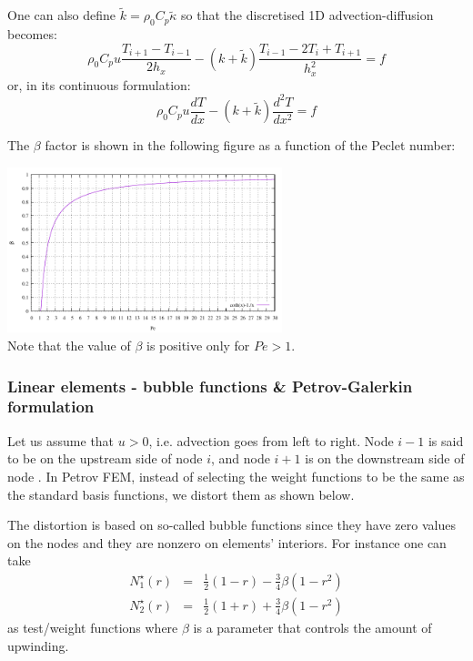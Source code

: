 One can also define $\tilde{k}=\rho_0 C_p \tilde{\kappa}$ so that 
the discretised 1D advection-diffusion becomes:
\begin{equation}
\rho_0 C_p u \frac{T_{i+1}-T_{i-1}}{2h_x}
- (k+ \tilde{k}) \frac{T_{i-1}-2T_i+T_{i+1}}{h_x^2}
= f 
\end{equation}
or, in its continuous formulation:
\[
\rho_0 C_p u \frac{dT}{dx} - (k+ \tilde{k}) \frac{d^2T}{dx^2} = f
\]




The $\beta$ factor is shown in the following figure as a function of the Peclet number:
\begin{center}
\includegraphics[width=8cm]{images/supg/beta}\\
{\captionfont Note that the value of $\beta$ is positive only for $Pe>1$.}
\end{center}


\subsubsection{Linear elements - bubble functions \& Petrov-Galerkin formulation}

Let us assume that $u>0$, i.e. advection goes from left to right. 
Node $i-1$ is said to be on the upstream side of node $i$, and node $i+1$
is on the downstream side of node . In Petrov FEM, instead of selecting the weight functions to be the
same as the standard basis functions, we distort them as shown below.

The distortion is based on so-called bubble functions since they have zero
values on the nodes and they are nonzero on elements' interiors.
For instance one can take
\begin{eqnarray}
{N}^\star_1(r)&=&\frac{1}{2}(1-r)-\frac{3}{4}\beta(1-r^2) \\
{N}^\star_2(r)&=&\frac{1}{2}(1+r)+\frac{3}{4}\beta(1-r^2) 
\end{eqnarray}
as test/weight functions
where $\beta$ is a parameter that controls the amount of upwinding. 


